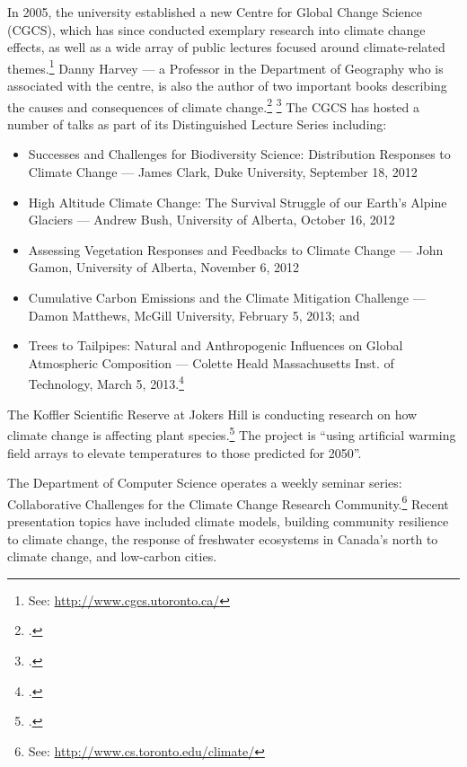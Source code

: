 In 2005, the university established a new Centre for Global Change Science (CGCS), which has since conducted exemplary research into climate change effects, as well as a wide array of public lectures focused around climate-related themes.\footnote{See: \url{http://www.cgcs.utoronto.ca/}}
Danny Harvey --- a Professor in the Department of Geography who is associated with the centre, is also the author of two important books describing the causes and consequences of climate change.\footcite[][]{Harvey1999a} \footcite[][]{Harvey1999b}
The CGCS has hosted a number of talks as part of its Distinguished Lecture Series including:
\begin{itemize}
	\item Successes and Challenges for Biodiversity Science: Distribution Responses to Climate Change --- James Clark, Duke University, September 18, 2012
	\item High Altitude Climate Change: The Survival Struggle of our Earth’s Alpine Glaciers --- Andrew Bush, University of Alberta, October 16, 2012 
	\item Assessing Vegetation Responses and Feedbacks to Climate Change --- John Gamon, University of Alberta, November 6, 2012
	\item Cumulative Carbon Emissions and the Climate Mitigation Challenge --- Damon Matthews, McGill University, February 5, 2013; and
	\item Trees to Tailpipes: Natural and Anthropogenic Influences on Global Atmospheric Composition --- Colette Heald Massachusetts Inst. of Technology, March 5, 2013.\footcite[][]{DistinguishedLecturer}
\end{itemize}


The Koffler Scientific Reserve at Jokers Hill is conducting research on how climate change is affecting plant species.\footcite[][]{KofflerCC}
The project is ``using artificial warming field arrays to elevate temperatures to those predicted for 2050''.



The Department of Computer Science operates a weekly seminar series: Collaborative Challenges for the Climate Change Research Community.\footnote{See: \url{http://www.cs.toronto.edu/climate/}}
Recent presentation topics have included climate models, building community resilience to climate change, the response of freshwater ecosystems in Canada's north to climate change, and low-carbon cities.



